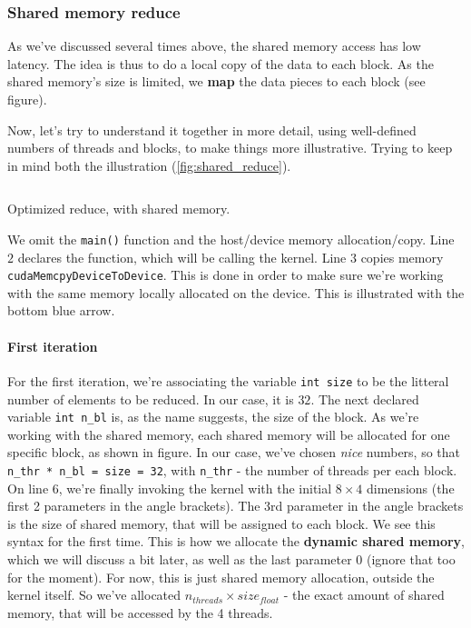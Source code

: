 \subsubsection*{Shared memory reduce}
As we've discussed several times above, the shared memory access has low latency. The idea is thus 
to do a local copy of the data to each block. As the shared memory's size is limited, we \textbf{map} the 
data pieces to each block (see figure).

Now, let's try to understand it together in more detail, using well-defined numbers of threads and blocks, 
to make things more illustrative. Trying to keep in mind both the illustration (\autoref{fig:shared_reduce}).

\begin{listing}
\inputminted[frame=single, framesep=1mm, linenos=true]{cuda}{cucodes/shared_rreduced.cu}
\caption{Optimized reduce, with shared memory. \cite{tuomanen2018hands}}
\end{listing}

We omit the \verb|main()| function and the host/device memory allocation/copy.
Line $2$ declares the function, which will be calling the kernel. Line $3$ copies memory 
\verb|cudaMemcpyDeviceToDevice|. This is done in order to make sure we're working with the same memory locally allocated on the device.
This is illustrated with the bottom blue arrow. 
\paragraph*{First iteration}
For the first iteration, we're associating the variable \verb|int size| to be the litteral 
number of elements to be reduced. In our case, it is $32$. The next declared variable \verb|int n_bl| is, 
as the name suggests, the size of the block. As we're working with the shared memory, each shared memory 
will be allocated for one specific block, as shown in figure. In our case, we've chosen \textit{nice} 
numbers, so that \verb|n_thr * n_bl = size = 32|, with \verb|n_thr| - the number of threads per each block.
On line $6$, we're finally invoking the kernel with the initial $8\times 4$ dimensions (the first 2 parameters in the angle brackets). 
The 3rd parameter in the angle brackets is the size of shared memory, that will be assigned to each block. 
We see this syntax for the first time. This is how we allocate the \textbf{dynamic shared memory}, which we will 
discuss a bit later, as well as the last parameter $0$ (ignore that too for the moment).
For now, this is just shared memory allocation, outside the kernel itself. So we've allocated 
$n_{threads}\times size_{float}$ - the exact amount of shared memory, that will be accessed by the 4 threads. 

